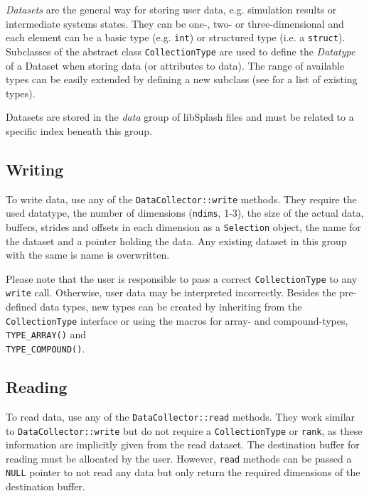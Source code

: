 \documentclass[a4paper,10pt,BCOR12mm]{report}
\newcommand{\code}[1]{\small \texttt{#1}}
\begin{document}
\emph{Datasets} are the general way for storing user data, e.g. simulation results or intermediate
systems states. They can be one-, two- or three-dimensional and each element can be
a basic type (e.g. \code{int}) or structured type (i.e. a \code{struct}).
Subclasses of the abstract class \code{CollectionType} are used to define the
\emph{Datatype} of a Dataset when storing data (or attributes to data).
The range of available types can be easily extended by defining a new subclass
(see  for a list of existing types).

Datasets are stored in the \emph{data} group of libSplash files and must be
related to a specific index beneath this group.

\subsection{Writing}
\label{lab:sdc:write}

To write data, use any of the \code{DataCollector::write} methods.
They require the used datatype, the number
of dimensions (\code{ndims}, 1-3), the size of the actual data, buffers, strides and offsets in
each dimension as a \code{Selection} object, the name for the dataset and a pointer
holding the data.
Any existing dataset in this group with the same is name is overwritten.

Please note that the user is responsible to pass a correct \code{CollectionType} to
any \code{write} call. Otherwise, user data may be interpreted incorrectly.
Besides the pre-defined data types, new types can be created by inheriting from the \code{CollectionType}
interface or using the macros for array- and compound-types, \code{TYPE\_ARRAY()} and \\ \code{TYPE\_COMPOUND()}.


\subsection{Reading}

To read data, use any of the \code{DataCollector::read} methods.
They work similar to \code{DataCollector::write} but do not require
a \code{CollectionType} or \code{rank}, as these information are implicitly given from
the read dataset.
The destination buffer for reading must be allocated by the user. However, \code{read} methods
can be passed a \code{NULL} pointer to not read any data but only return the required dimensions of the
destination buffer.
\end{document}
